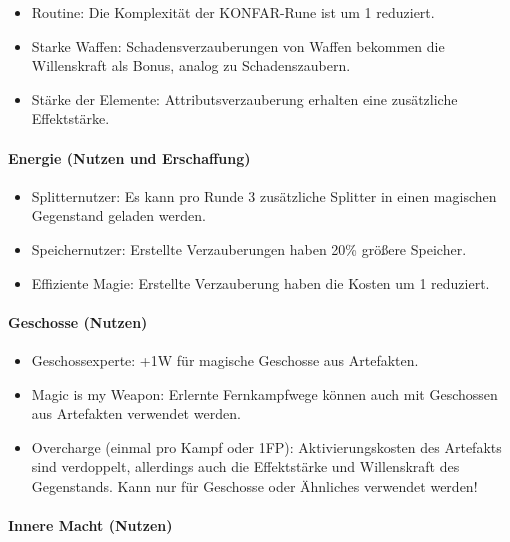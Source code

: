 \documentclass{article}
\begin{document}
\begin{itemize}
\item Routine: Die Komplexität der KONFAR-Rune ist um 1 reduziert.
\item Starke Waffen: Schadensverzauberungen von Waffen bekommen die Willenskraft als Bonus, analog zu Schadenszaubern.
\item Stärke der Elemente: Attributsverzauberung erhalten eine zusätzliche Effektstärke.
\end{itemize}

\paragraph{Energie (Nutzen und Erschaffung)}

\begin{itemize}
\item Splitternutzer: Es kann pro Runde 3 zusätzliche Splitter in einen magischen Gegenstand geladen werden.
\item Speichernutzer: Erstellte Verzauberungen haben 20\% größere Speicher.
\item Effiziente Magie: Erstellte Verzauberung haben die Kosten um 1 reduziert.
\end{itemize}

\paragraph{Geschosse (Nutzen)}

\begin{itemize}
\item Geschossexperte: +1W für magische Geschosse aus Artefakten.
\item Magic is my Weapon: Erlernte Fernkampfwege können auch mit Geschossen aus Artefakten verwendet werden.
\item Overcharge (einmal pro Kampf oder 1FP): Aktivierungskosten des Artefakts sind verdoppelt, allerdings auch die Effektstärke und Willenskraft des Gegenstands. Kann nur für Geschosse oder Ähnliches verwendet werden!
\end{itemize}

\paragraph{Innere Macht (Nutzen)}
\end{document}
